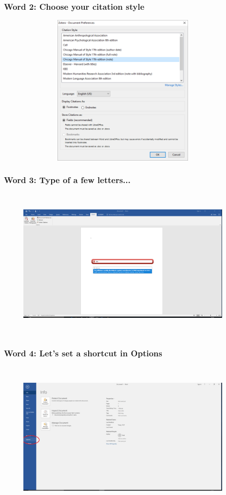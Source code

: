 \documentclass[12pt]{beamer}
\begin{document}
\begin{frame} \frametitle{Word 2: Choose your citation style} \begin{figure}[!h] \centering
	\includegraphics[height=3in, width = 4.25in,keepaspectratio]{zotero/word_2.png}
\end{figure} \end{frame}

\begin{frame} \frametitle{Word 3: Type of a few letters...} \begin{figure}[!h] \centering
	\includegraphics[height=3in, width = 4.25in,keepaspectratio]{zotero/word_3.png}
\end{figure} \end{frame}

\begin{frame} \frametitle{Word 4: Let's set a shortcut in Options} \begin{figure}[!h] \centering
	\includegraphics[height=3in, width = 4.25in,keepaspectratio]{zotero/word_4.png}
\end{figure} \end{frame}
\end{document}
